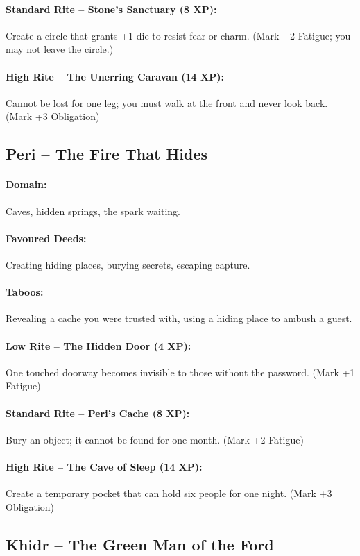 \documentclass[11pt]{book}
\begin{document}
\paragraph{Standard Rite -- Stone’s Sanctuary (8 XP):} Create a circle that grants +1 die to resist fear or charm. (Mark +2 Fatigue; you may not leave the circle.)
\paragraph{High Rite -- The Unerring Caravan (14 XP):} Cannot be lost for one leg; you must walk at the front and never look back. (Mark +3 Obligation)

\subsection{Peri – The Fire That Hides}
\paragraph{Domain:} Caves, hidden springs, the spark waiting.
\paragraph{Favoured Deeds:} Creating hiding places, burying secrets, escaping capture.
\paragraph{Taboos:} Revealing a cache you were trusted with, using a hiding place to ambush a guest.
\paragraph{Low Rite -- The Hidden Door (4 XP):} One touched doorway becomes invisible to those without the password. (Mark +1 Fatigue)
\paragraph{Standard Rite -- Peri’s Cache (8 XP):} Bury an object; it cannot be found for one month. (Mark +2 Fatigue)
\paragraph{High Rite -- The Cave of Sleep (14 XP):} Create a temporary pocket that can hold six people for one night. (Mark +3 Obligation)

\subsection{Khidr – The Green Man of the Ford}
\end{document}
